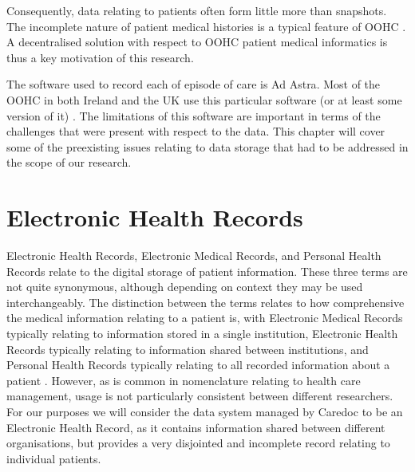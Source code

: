Consequently, data relating to patients often form little more than snapshots. The incomplete nature of patient medical histories is a typical feature of OOHC \cite{aldosari2017patients}. A decentralised solution with respect to OOHC patient medical informatics is thus a key motivation of this research. 

The software used to record each of episode of care is Ad Astra\texttrademark \cite{adastra}. Most of the OOHC in both Ireland and the UK use this particular software (or at least some version of it) \cite{natreview}. The limitations of this software are important in terms of the challenges that were present with respect to the data. This chapter will cover some of the preexisting issues relating to data storage that had to be addressed in the scope of our research. 

 
 \section{Electronic Health Records}

Electronic Health Records, Electronic Medical Records, and Personal Health Records relate to the digital storage of patient information. These three terms are not quite synonymous, although depending on context they may be used interchangeably. The distinction between the terms relates to how comprehensive the medical information relating to a patient is, with Electronic Medical Records typically relating to information stored in a single institution, Electronic Health Records typically relating to information shared between institutions, and Personal Health Records typically relating to all recorded information about a patient \cite{heart2017review}. However, as is common in nomenclature relating to health care management, usage is not particularly consistent between different researchers. For our purposes we will consider the data system managed by Caredoc to be an Electronic Health Record, as it contains information shared between different organisations, but provides a very disjointed and incomplete record relating to individual patients.  

